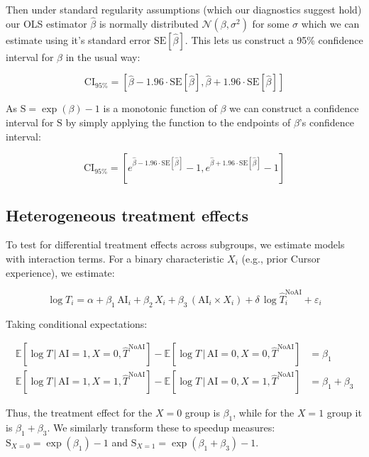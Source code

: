 \documentclass{article}
\begin{document}
Then under standard regularity assumptions (which our diagnostics suggest hold) our OLS estimator $\hat\beta$ is normally distributed $\mathcal{N}(\beta, \sigma^2)$ for some $\sigma$ which we can estimate using it's standard error $\text{SE}[\hat\beta]$. This lets us construct a 95\% confidence interval for $\beta$ in the usual way:

\begin{equation}
\text{CI}_{95\%} = \left[\hat\beta - 1.96 \cdot \text{SE}[\hat\beta], \hat\beta + 1.96 \cdot \text{SE}[\hat\beta]\right]
\end{equation}

As $\text{S} = \exp(\beta) - 1$ is a monotonic function of $\beta$ we can construct a confidence interval for $\text{S}$ by simply applying the function to the endpoints of $\beta$'s confidence interval:

\begin{equation}
\text{CI}_{95\%} = \left[e^{\hat\beta - 1.96 \cdot \text{SE}[\hat\beta]} - 1, e^{\hat\beta + 1.96 \cdot \text{SE}[\hat\beta]} - 1\right]
\end{equation}

\subsection{Heterogeneous treatment effects}
\label{sec:heterogeneous_treatment_effect_estimation}

To test for differential treatment effects across subgroups, we estimate models with interaction terms. For a binary characteristic $X_i$ (e.g., prior Cursor experience), we estimate:

\begin{equation}
\log T_i = \alpha + \beta_1\,\text{AI}_i + \beta_2\,X_i + \beta_3\,(\text{AI}_i \times X_i) + \delta\,\log \widehat{T}^{\text{NoAI}}_i + \varepsilon_i
\end{equation}

Taking conditional expectations:

\begin{align}
\mathbb{E}[\log T\,|\,\text{AI}=1, X=0, \widehat{T}^{\text{NoAI}}] - \mathbb{E}[\log T\,|\,\text{AI}=0, X=0, \widehat{T}^{\text{NoAI}}] &= \beta_1\\
\mathbb{E}[\log T\,|\,\text{AI}=1, X=1, \widehat{T}^{\text{NoAI}}] - \mathbb{E}[\log T\,|\,\text{AI}=0, X=1, \widehat{T}^{\text{NoAI}}] &= \beta_1 + \beta_3
\end{align}

Thus, the treatment effect for the $X=0$ group is $\beta_1$, while for the $X=1$ group it is $\beta_1 + \beta_3$. We similarly transform these to speedup measures: $\text{S}_{X=0} = \exp(\beta_1) - 1$ and $\text{S}_{X=1} = \exp(\beta_1 + \beta_3) - 1$.
\end{document}
